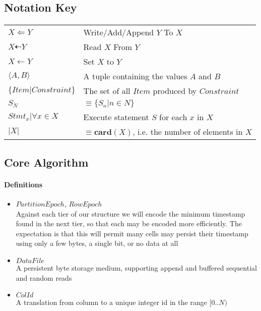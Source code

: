 \documentclass[fleqn]{article}
\begin{document}
\subsection{Notation Key}
\paragraph{}
\begin{tabular}{l l}
$X \Leftarrow Y$ & Write/Add/Append $Y$ To $X$\\
$X \dashleftarrow Y$ & Read $X$ From $Y$\\
$X \gets Y$ & Set $X$ to $Y$\\
$\langle A,B \rangle$ & A tuple containing the values $A$ and $B$\\
$\{Item | Constraint\}$ & The set of all $Item$ produced by $Constraint$\\
$S_N$ & $\equiv \{S_n | n \in N\}$\\
$Stmt_x | \forall x \in X$ & Execute statement $S$ for each $x$ in $X$\\
$\lvert X \rvert$ & $\equiv \mathbf{card}(X)$, i.e. the number of elements in $X$\\
\end{tabular}

\clearpage
\subsection{Core Algorithm}
\paragraph{Definitions}
\begin{itemize}
  \item $PartitionEpoch$, $RowEpoch$\\[2pt]
    Against each tier of our structure we will encode the minimum timestamp found in the next
    tier, so that each may be encoded more efficiently. The expectation is that this will permit
    many cells may persist their timestamp using only a few bytes, a single bit, or no data at all
  \item $DataFile$\\[2pt]
    A persistent byte storage medium, supporting append and buffered sequential and random reads
  \item $ColId$\\[2pt]
    A translation from column to a unique integer id in the range $[0..N)$
\end{itemize}
\end{document}
